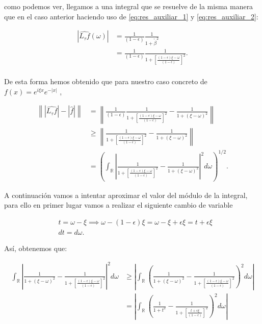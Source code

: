 \begin{observacion}
  \noindent como podemos ver, llegamos a una integral que se resuelve de la misma manera que en el caso anterior haciendo uso de \eqref{eq:res_auxiliar_1} y \eqref{eq:res_auxiliar_2}:

  \begin{align*}
    |\widehat{L_\tau f}(\omega)| 
    &= \frac{1}{(1-\epsilon)} \frac{1}{1+\tilde{\beta}^2} \\
    &= \frac{1}{(1-\epsilon)} \frac{1}{1+\left[ \frac{(1-\epsilon) \xi - \omega}{(1-\epsilon)}\right]^2}. \\
  \end{align*}


  \noindent De esta forma hemos obtenido que para nuestro caso concreto de $f(x)=e^{i \xi x}e^{-|x|}$ ,


  \begin{align*}
    \left\| |\widehat{L_\tau f}|-|\widehat{f}| \right\| &= \left\| \frac{1}{(1-\epsilon)} \frac{1}{1+\left[ \frac{(1-\epsilon) \xi - \omega}{(1-\epsilon)}\right]^2}-\frac{1}{1+(\xi - \omega)^2} \right\| \\
    &\geq  \left\| \frac{1}{1+\left[ \frac{(1-\epsilon) \xi - \omega}{(1-\epsilon)}\right]^2}-\frac{1}{1+(\xi - \omega)^2} \right\| \\
    &=\left(\int_{\mathbb{R}} \left| \frac{1}{1+\left[ \frac{(1-\epsilon) \xi - \omega}{(1-\epsilon)}\right]^2}-\frac{1}{1+(\xi - \omega)^2} \right|^2 d\omega\right)^{1/2}.
  \end{align*}


  \noindent A continuación vamos a intentar aproximar el valor del módulo de la integral, para ello en primer lugar vamos a realizar el siguiente cambio de variable 

  \begin{align*}
    &t=\omega-\xi \implies \omega-(1-\epsilon)\xi= \omega-\xi + \epsilon\xi = t +\epsilon\xi \\
    &dt=d\omega.
  \end{align*}

  \noindent Así, obtenemos que: 

  \begin{align*}
    \int_{\mathbb{R}} \left| \frac{1}{1+(\xi - \omega)^2} - \frac{1}{1+\left[ \frac{(1-\epsilon) \xi - \omega}{(1-\epsilon)}\right]^2} \right|^2 d\omega &\geq
    \left|\int_{\mathbb{R}} \left(  \frac{1}{1+(\xi - \omega)^2} - \frac{1}{1+\left[ \frac{(1-\epsilon) \xi - \omega}{(1-\epsilon)}\right]^2}  \right)^2 d\omega \right| \\
    &=\left|\int_{\mathbb{R}} \left(  \frac{1}{1+t^2} - \frac{1}{1+\left[ \frac{t+\epsilon\xi}{(1-\epsilon)}\right]^2}  \right)^2 d\omega \right| \\
  \end{align*}


\end{observacion}
